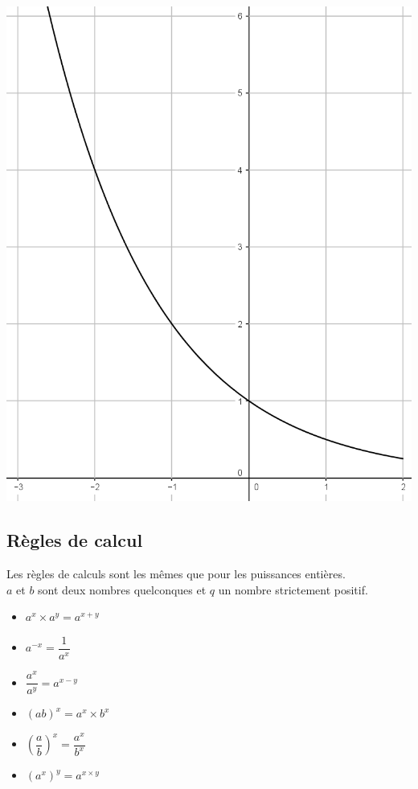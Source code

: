 \documentclass[12pt,a4paper]{article}
\begin{document}
\begin{myex}
\begin{multicols}{2}
		\begin{center}
			\includegraphics[scale=0.25]{./img/var2}
		\end{center}
	\end{multicols}
\end{myex}

\subsection{Règles de calcul}

\begin{myprops}
	Les règles de calculs sont les mêmes que pour les puissances entières.\\
	$a$ et $b$ sont deux nombres quelconques et $q$ un nombre strictement positif.
	
	\begin{multicols}{3}
		
		\begin{itemize}
			\item $a^x \times a^y = a^{x+y}$
			\item $a^{-x} = \dfrac{1}{a^x}$
			\item $\dfrac{a^x}{a^y} = a^{x-y}$
			\item $(ab)^x = a^x \times b^x$
			\item $ \left( \dfrac{a}{b} \right)^x = \dfrac{a^x}{b^x}$
			\item $(a^x)^y = a^{x \times y}$
		\end{itemize}	
		
	\end{multicols}
\end{myprops}
\end{document}
